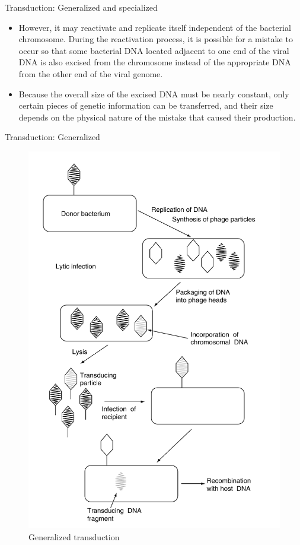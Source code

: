 \documentclass[ignorenonframetext,aspectratio=169]{beamer}
\providecommand{\tightlist}{%
  \setlength{\itemsep}{0pt}\setlength{\parskip}{0pt}}
\begin{document}
\begin{frame}{Transduction: Generalized and specialized}
\protect\hypertarget{transduction-generalized-and-specialized-1}{}

\begin{itemize}
\tightlist
\item
  However, it may reactivate and replicate itself independent of the
  bacterial chromosome. During the reactivation process, it is possible
  for a mistake to occur so that some bacterial DNA located adjacent to
  one end of the viral DNA is also excised from the chromosome instead
  of the appropriate DNA from the other end of the viral genome.
\item
  Because the overall size of the excised DNA must be nearly constant,
  only certain pieces of genetic information can be transferred, and
  their size depends on the physical nature of the mistake that caused
  their production.
\end{itemize}

\end{frame}

\begin{frame}{Transduction: Generalized}
\protect\hypertarget{transduction-generalized}{}

\begin{figure}
\includegraphics[width=0.25\linewidth]{./../images/transduction_generalized} \caption{Generalized transduction}\label{fig:transduction-gen}
\end{figure}

\end{frame}
\end{document}
